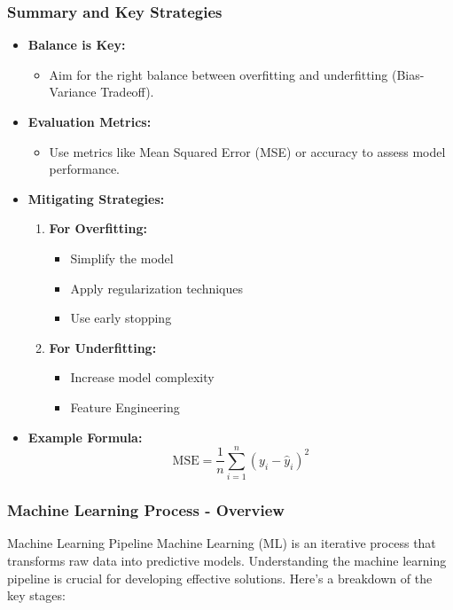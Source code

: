 \documentclass[aspectratio=169]{beamer}
\begin{document}
\begin{frame}[fragile]
    \frametitle{Summary and Key Strategies}
    
    \begin{itemize}
        \item \textbf{Balance is Key:}
        \begin{itemize}
            \item Aim for the right balance between overfitting and underfitting (Bias-Variance Tradeoff).
        \end{itemize}
        
        \item \textbf{Evaluation Metrics:}
        \begin{itemize}
            \item Use metrics like Mean Squared Error (MSE) or accuracy to assess model performance.
        \end{itemize}
        
        \item \textbf{Mitigating Strategies:}
        \begin{enumerate}
            \item \textbf{For Overfitting:}
            \begin{itemize}
                \item Simplify the model
                \item Apply regularization techniques
                \item Use early stopping
            \end{itemize}
            \item \textbf{For Underfitting:}
            \begin{itemize}
                \item Increase model complexity
                \item Feature Engineering
            \end{itemize}
        \end{enumerate}
        
        \item \textbf{Example Formula:}
        \begin{equation}
        \text{MSE} = \frac{1}{n} \sum_{i=1}^{n} (y_i - \hat{y}_i)^2
        \end{equation}
    \end{itemize}
\end{frame}

\begin{frame}[fragile]
  \frametitle{Machine Learning Process - Overview}
  \begin{block}{Machine Learning Pipeline}
    Machine Learning (ML) is an iterative process that transforms raw data into predictive models. Understanding the machine learning pipeline is crucial for developing effective solutions. Here’s a breakdown of the key stages:
  \end{block}
\end{frame}
\end{document}
